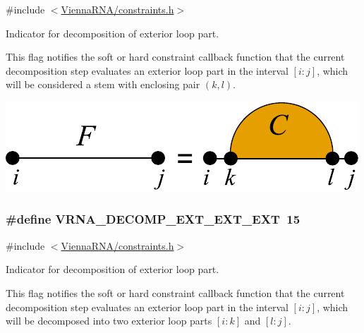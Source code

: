 {\ttfamily \#include $<$\hyperlink{constraints_8h}{Vienna\+R\+N\+A/constraints.\+h}$>$}



Indicator for decomposition of exterior loop part. 

This flag notifies the soft or hard constraint callback function that the current decomposition step evaluates an exterior loop part in the interval $[i:j]$, which will be considered a stem with enclosing pair $(k,l)$.

 
\begin{DoxyImageNoCaption}
  \mbox{\includegraphics[width=\textwidth,height=\textheight/2,keepaspectratio=true]{decomp_ext_stem}}
\end{DoxyImageNoCaption}
 \hypertarget{group__constraints_ga803bd818b3f4b2b0a4a5cfa2f7dc2045}{}
\subsubsection[{V\+R\+N\+A\+\_\+\+D\+E\+C\+O\+M\+P\+\_\+\+E\+X\+T\+\_\+\+E\+X\+T\+\_\+\+E\+X\+T}]{\setlength{\rightskip}{0pt plus 5cm}\#define V\+R\+N\+A\+\_\+\+D\+E\+C\+O\+M\+P\+\_\+\+E\+X\+T\+\_\+\+E\+X\+T\+\_\+\+E\+X\+T~15}\label{group__constraints_ga803bd818b3f4b2b0a4a5cfa2f7dc2045}


{\ttfamily \#include $<$\hyperlink{constraints_8h}{Vienna\+R\+N\+A/constraints.\+h}$>$}



Indicator for decomposition of exterior loop part. 

This flag notifies the soft or hard constraint callback function that the current decomposition step evaluates an exterior loop part in the interval $[i:j]$, which will be decomposed into two exterior loop parts $[i:k]$ and $[l:j]$.

